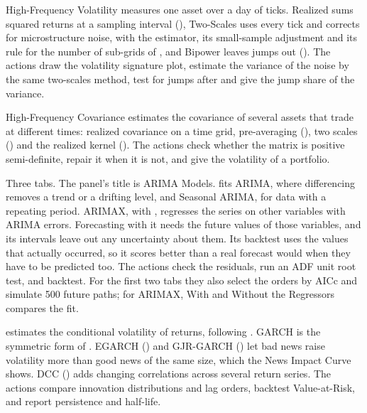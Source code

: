 High-Frequency Volatility measures one asset over a day of ticks. Realized sums squared returns at a sampling interval (), Two-Scales uses every tick and corrects for microstructure noise, with the estimator, its small-sample adjustment and its rule for the number of sub-grids of , and Bipower leaves jumps out (). The actions draw the volatility signature plot, estimate the variance of the noise by the same two-scales method, test for jumps after  and give the jump share of the variance.

High-Frequency Covariance estimates the covariance of several assets that trade at different times: realized covariance on a time grid, pre-averaging (), two scales () and the realized kernel (). The actions check whether the matrix is positive semi-definite, repair it when it is not, and give the volatility of a portfolio.

Three tabs. The panel's title is ARIMA Models.  fits ARIMA, where differencing removes a trend or a drifting level, and Seasonal ARIMA, for data with a repeating period. ARIMAX, with , regresses the series on other variables with ARIMA errors. Forecasting with it needs the future values of those variables, and its intervals leave out any uncertainty about them. Its backtest uses the values that actually occurred, so it scores better than a real forecast would when they have to be predicted too. The actions check the residuals, run an ADF unit root test, and backtest. For the first two tabs they also select the orders by AICc and simulate 500 future paths; for ARIMAX, With and Without the Regressors compares the fit.

 estimates the conditional volatility of returns, following . GARCH is the symmetric form of . EGARCH () and GJR-GARCH () let bad news raise volatility more than good news of the same size, which the News Impact Curve shows. DCC () adds changing correlations across several return series. The actions compare innovation distributions and lag orders, backtest Value-at-Risk, and report persistence and half-life.


